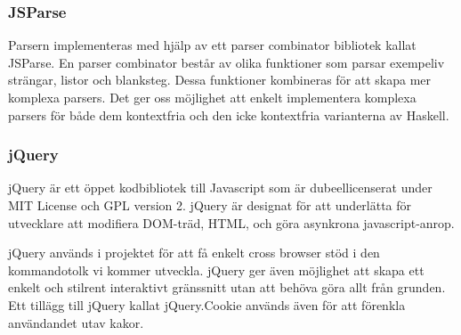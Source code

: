 \subsubsection{JSParse}  
Parsern implementeras med hjälp av ett parser combinator bibliotek kallat JSParse. 
En parser combinator består av olika funktioner som parsar exempeliv strängar, listor och blanksteg.
Dessa funktioner kombineras för att skapa mer komplexa parsers. Det ger oss möjlighet att enkelt implementera komplexa
parsers för både dem kontextfria och den icke kontextfria varianterna av Haskell.

\subsubsection{jQuery} 
jQuery är ett öppet kodbibliotek till Javascript som är dubeellicenserat under MIT License och GPL version 2.  
jQuery är designat för att underlätta för utvecklare att modifiera DOM-träd, HTML, och göra asynkrona javascript-anrop.

jQuery används i projektet för att få enkelt cross browser stöd i den kommandotolk vi kommer utveckla. 
jQuery ger även möjlighet att skapa ett enkelt och stilrent interaktivt gränssnitt utan att behöva göra allt från grunden.
Ett tillägg till jQuery kallat jQuery.Cookie används även för att förenkla användandet utav kakor.
